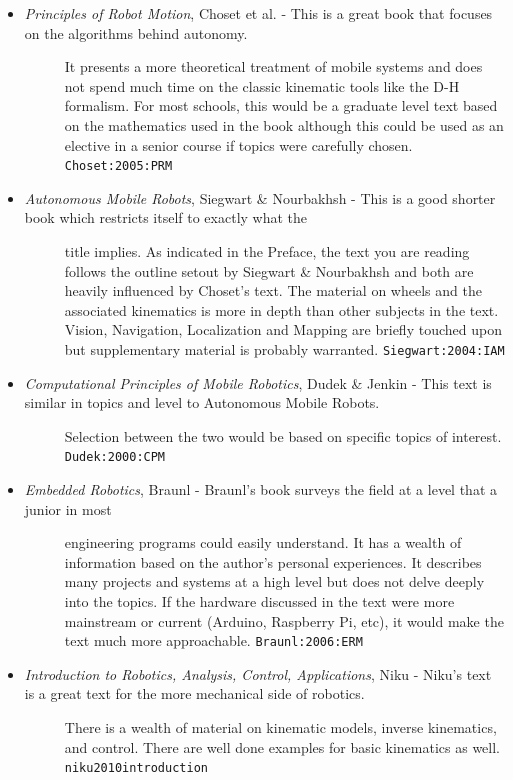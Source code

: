 \begin{itemize}
\item
  \begin{description}
  \item[\emph{Principles of Robot Motion}, Choset et al. - This is a
  great book that focuses on the algorithms behind autonomy.]
  It presents a more theoretical treatment of mobile systems and does
  not spend much time on the classic kinematic tools like the D-H
  formalism. For most schools, this would be a graduate level text based
  on the mathematics used in the book although this could be used as an
  elective in a senior course if topics were carefully chosen.
  \texttt{Choset:2005:PRM}
  \end{description}
\item
  \begin{description}
  \item[\emph{Autonomous Mobile Robots}, Siegwart \& Nourbakhsh - This
  is a good shorter book which restricts itself to exactly what the]
  title implies. As indicated in the Preface, the text you are reading
  follows the outline setout by Siegwart \& Nourbakhsh and both are
  heavily influenced by Choset's text. The material on wheels and the
  associated kinematics is more in depth than other subjects in the
  text. Vision, Navigation, Localization and Mapping are briefly touched
  upon but supplementary material is probably warranted.
  \texttt{Siegwart:2004:IAM}
  \end{description}
\item
  \begin{description}
  \item[\emph{Computational Principles of Mobile Robotics}, Dudek \&
  Jenkin - This text is similar in topics and level to Autonomous Mobile
  Robots.]
  Selection between the two would be based on specific topics of
  interest. \texttt{Dudek:2000:CPM}
  \end{description}
\item
  \begin{description}
  \item[\emph{Embedded Robotics}, Braunl - Braunl's book surveys the
  field at a level that a junior in most]
  engineering programs could easily understand. It has a wealth of
  information based on the author's personal experiences. It describes
  many projects and systems at a high level but does not delve deeply
  into the topics. If the hardware discussed in the text were more
  mainstream or current (Arduino, Raspberry Pi, etc), it would make the
  text much more approachable. \texttt{Braunl:2006:ERM}
  \end{description}
\item
  \begin{description}
  \item[\emph{Introduction to Robotics, Analysis, Control,
  Applications}, Niku - Niku's text is a great text for the more
  mechanical side of robotics.]
  There is a wealth of material on kinematic models, inverse kinematics,
  and control. There are well done examples for basic kinematics as
  well. \texttt{niku2010introduction}
  \end{description}
\end{itemize}

